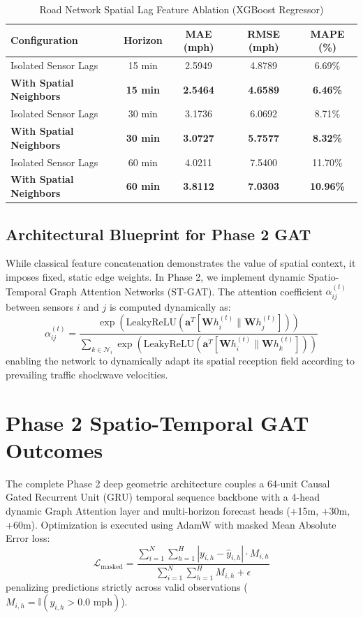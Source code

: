 \documentclass[conference]{IEEEtran}
\begin{document}
\begin{table}[t]
\caption{Road Network Spatial Lag Feature Ablation (XGBoost Regressor)}
\label{tab:ablation}
\centering
\begin{tabular}{lcccc}
\toprule
\textbf{Configuration} & \textbf{Horizon} & \textbf{MAE (mph)} & \textbf{RMSE (mph)} & \textbf{MAPE (\%)} \\
\midrule
Isolated Sensor Lags   & 15 min & 2.5949 & 4.8789 & 6.69\% \\
\textbf{With Spatial Neighbors} & \textbf{15 min} & \textbf{2.5464} & \textbf{4.6589} & \textbf{6.46\%} \\
\midrule
Isolated Sensor Lags   & 30 min & 3.1736 & 6.0692 & 8.71\% \\
\textbf{With Spatial Neighbors} & \textbf{30 min} & \textbf{3.0727} & \textbf{5.7577} & \textbf{8.32\%} \\
\midrule
Isolated Sensor Lags   & 60 min & 4.0211 & 7.5400 & 11.70\% \\
\textbf{With Spatial Neighbors} & \textbf{60 min} & \textbf{3.8112} & \textbf{7.0303} & \textbf{10.96\%} \\
\bottomrule
\end{tabular}
\end{table}

\subsection{Architectural Blueprint for Phase 2 GAT}
While classical feature concatenation demonstrates the value of spatial context, it imposes fixed, static edge weights. In Phase 2, we implement dynamic Spatio-Temporal Graph Attention Networks (ST-GAT). The attention coefficient $\alpha_{ij}^{(t)}$ between sensors $i$ and $j$ is computed dynamically as:
\begin{equation}
    \alpha_{ij}^{(t)} = \frac{\exp\left(\text{LeakyReLU}\left(\mathbf{a}^T [\mathbf{W}h_i^{(t)} \parallel \mathbf{W}h_j^{(t)}]\right)\right)}{\sum_{k \in \mathcal{N}_i} \exp\left(\text{LeakyReLU}\left(\mathbf{a}^T [\mathbf{W}h_i^{(t)} \parallel \mathbf{W}h_k^{(t)}]\right)\right)}
\end{equation}
enabling the network to dynamically adapt its spatial reception field according to prevailing traffic shockwave velocities.

\section{Phase 2 Spatio-Temporal GAT Outcomes}
The complete Phase 2 deep geometric architecture couples a 64-unit Causal Gated Recurrent Unit (GRU) temporal sequence backbone with a 4-head dynamic Graph Attention layer and multi-horizon forecast heads (+15m, +30m, +60m). Optimization is executed using AdamW with masked Mean Absolute Error loss:
\begin{equation}
    \mathcal{L}_{\text{masked}} = \frac{\sum_{i=1}^N \sum_{h=1}^H |y_{i,h} - \hat{y}_{i,h}| \cdot M_{i,h}}{\sum_{i=1}^N \sum_{h=1}^H M_{i,h} + \epsilon}
\end{equation}
penalizing predictions strictly across valid observations ($M_{i,h} = \mathbb{I}(y_{i,h} > 0.0\text{ mph})$).
\end{document}
